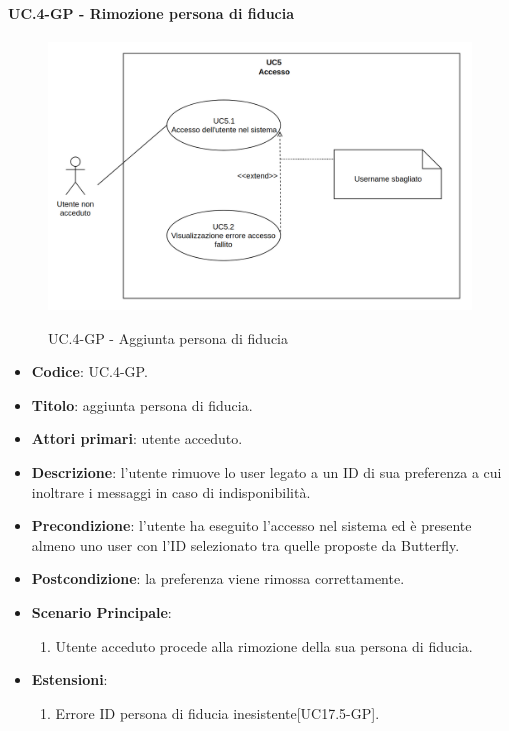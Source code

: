		\paragraph{UC\theuccount.4-GP - Rimozione persona di fiducia}
		\begin{figure}[H]
			\centering
			\includegraphics[width=\columnwidth]{img/UC5.png}\\
			\caption{UC\theuccount.4-GP - Aggiunta persona di fiducia}
		\end{figure}
		\begin{itemize}
			\item \textbf{Codice}: UC\theuccount.4-GP.
			\item \textbf{Titolo}: aggiunta persona di fiducia.
			\item \textbf{Attori primari}: utente acceduto.
			\item \textbf{Descrizione}:  l’utente rimuove lo user legato a un ID di sua preferenza a cui inoltrare
			i messaggi in caso di indisponibilità.
			\item \textbf{Precondizione}: l’utente ha eseguito l'accesso nel sistema ed è presente almeno
			uno user con l'ID selezionato tra quelle proposte da Butterfly.
			\item \textbf{Postcondizione}: la preferenza viene rimossa correttamente.
			\item \textbf{Scenario Principale}:
			\begin{enumerate}
				\item Utente acceduto procede alla rimozione della sua persona di fiducia.
			\end{enumerate}
			\item \textbf{Estensioni}:
			\begin{enumerate}
				\item Errore ID persona di fiducia inesistente[UC17.5-GP].
			\end{enumerate}
		\end{itemize}
		
